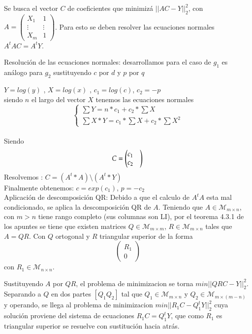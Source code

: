 \documentclass{endm}
\begin{document}
Se busca el vector $C$ de coeficientes que minimizá $||AC - Y||^2_2$,
con $A = \begin{pmatrix}X_1 & 1 \\ \vdots & \vdots \\ X_m & 1 \end{pmatrix}$.
Para esto se deben resolver las ecuaciones normales $A^tAC = A^tY$.

Resolución de las ecuaciones normales:
desarrollamos para el caso de $g_{1}$ es análogo para $g_{2}$ sustituyendo $c$ por $d$ y $p$ por $q$ 

$Y =log(y)$ , $X =log(x)$ , $c_1= log(c)$, $c_2= -p$ \\
siendo $n$ el largo del vector $X$ tenemos las ecuaciones normales
\begin{equation}
\begin{cases}
\sum Y = n * c_1 + c_2 * \sum X \\
\sum X * Y = c_1 * \sum X + c_2 * \sum X^2
\end{cases}
\end{equation}  \\
Siendo \begin{equation*}C=\begin{pmatrix}
          c_1 & \\
          c_2
         \end{pmatrix} \\
\end{equation*}
Resolvemos : $ C=(A^t * A) \setminus  (A^t * Y)$ \\
Finalmente obtenemos:  $c= exp(c_1)$, $p = -c_2$ \\


Aplicación de descomposición QR:
Debido a que el calculo de $A^tA$ esta mal condicionado, se aplica la descomposición QR de $A$.
Teniendo que $A \in \mathcal{M}_{m \times n}$, con $m > n$ tiene rango completo (sus columnas son LI),
por el teorema 4.3.1 de los apuntes se tiene que existen matrices $Q \in \mathcal{M}_{m \times m}$,
$R \in \mathcal{M}_{m \times n}$ tales que $A = QR$. Con $Q$ ortogonal
y $R$ triangular superior de la forma  \begin{equation*} \begin{pmatrix} R_1 \\ 0 \end{pmatrix}\end{equation*} con $R_1 \in \mathcal{M}_{n \times n}$.

Sustituyendo $A$ por $QR$, el problema de minimizacion se torna $min ||QRC - Y||^2_2$.
Separando a $Q$ en dos partes $[Q_1 Q_2]$ tal que $Q_1 \in \mathcal{M}_{m \times n}$ y
$Q_2 \in \mathcal{M}_{m \times (m-n)}$ y operando, se llega al problema de minimizacion $min ||R_1C - Q_1^tY||^2_2$
cuya solución proviene del sistema de ecuaciones $R_1C = Q_1^tY$, que como $R_1$ es triangular superior se resuelve con
sustitución hacia atrás.
\end{document}
